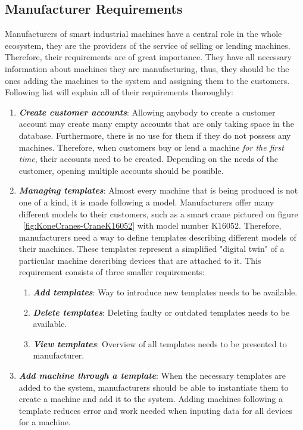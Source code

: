 \subsection{Manufacturer Requirements}

Manufacturers of smart industrial machines have a central role in the whole ecosystem, they are the providers of the service of selling or lending machines. Therefore, their requirements are of great importance. They have all necessary information about machines they are manufacturing, thus, they should be the ones adding the machines to the system and assigning them to the customers. Following list will explain all of their requirements thoroughly:

\begin{enumerate}
	\setlength{\itemsep}{1pt}
	\item \textbf{\textit{Create customer accounts}}: Allowing anybody to create a customer account may create many empty accounts that are only taking space in the database. Furthermore, there is no use for them if they do not possess any machines. Therefore, when customers buy or lend a machine \emph{for the first time}, their accounts need to be created. Depending on the needs of the customer, opening multiple accounts should be possible. 

	\item \textbf{\textit{Managing templates}}: Almost every machine that is being produced is not one of a kind, it is made following a model. Manufacturers offer many different models to their customers, such as a smart crane pictured on figure ~\ref{fig:KoneCranes-CraneK16052} with model number K16052. Therefore, manufacturers need a way to define templates describing different models of their machines. These templates represent a simplified "digital twin" of a particular machine describing devices that are attached to it. This requirement consists of three smaller requirements:

	\begin{enumerate}
		\item \textbf{\textit{Add templates}}: Way to introduce new templates needs to be available.
		\item \textbf{\textit{Delete templates}}: Deleting faulty or outdated templates needs to be available.
		\item \textbf{\textit{View templates}}: Overview of all templates needs to be presented to manufacturer. 
	\end{enumerate}

	\item \textbf{\textit{Add machine through a template}}: When the necessary templates are added to the system, manufacturers should be able to instantiate them to create a machine and add it to the system. Adding machines following a template reduces error and work needed when inputing data for all devices for a machine.


\end{enumerate}
